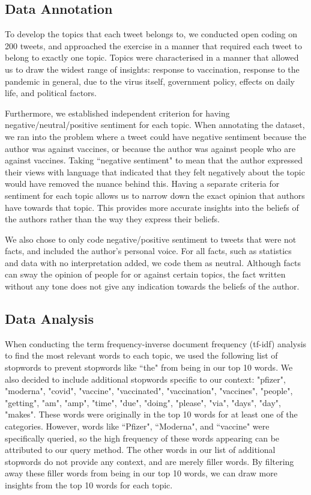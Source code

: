 \documentclass[letterpaper]{article} %
\begin{document}
\subsection{Data Annotation}
To develop the topics that each tweet belongs to, we conducted open coding on 200 tweets, and approached the exercise in a manner that required each tweet to belong to exactly one topic. Topics were characterised in a manner that allowed us to draw the widest range of insights: response to vaccination, response to the pandemic in general, due to the virus itself, government policy, effects on daily life, and political factors. \par
Furthermore, we established independent criterion for having negative/neutral/positive sentiment for each topic. When annotating the dataset, we ran into the problem where a tweet could have negative sentiment because the author was against vaccines, or because the author was against people who are against vaccines. Taking ``negative sentiment" to mean that the author expressed their views with language that indicated that they felt negatively about the topic would have removed the nuance behind this. Having a separate criteria for sentiment for each topic allows us to narrow down the exact opinion that authors have towards that topic. This provides more accurate insights into the beliefs of the authors rather than the way they express their beliefs. \par
We also chose to only code negative/positive sentiment to tweets that were not facts, and included the author's personal voice. For all facts, such as statistics and data with no interpretation added, we code them as neutral. Although facts can sway the opinion of people for or against certain topics, the fact written without any tone does not give any indication towards the beliefs of the author. 
\subsection{Data Analysis}
When conducting the term frequency-inverse document frequency (tf-idf) analysis to find the most relevant words to each topic, we used the following list of stopwords \cite{c:1} to prevent stopwords like ``the" from being in our top 10 words. We also decided to include additional stopwords specific to our context: "pfizer", "moderna", "covid", "vaccine", "vaccinated", "vaccination", "vaccines", "people", "getting", "am", "amp", "time", "due", "doing", "please", "via", "days", "day", "makes". These words were originally in the top 10 words for at least one of the categories. However, words like ``Pfizer", ``Moderna", and ``vaccine" were specifically queried, so the high frequency of these words appearing can be attributed to our query method. The other words in our list of additional stopwords do not provide any context, and are merely filler words. By filtering away these filler words from being in our top 10 words, we can draw more insights from the top 10 words for each topic. 
\end{document}
